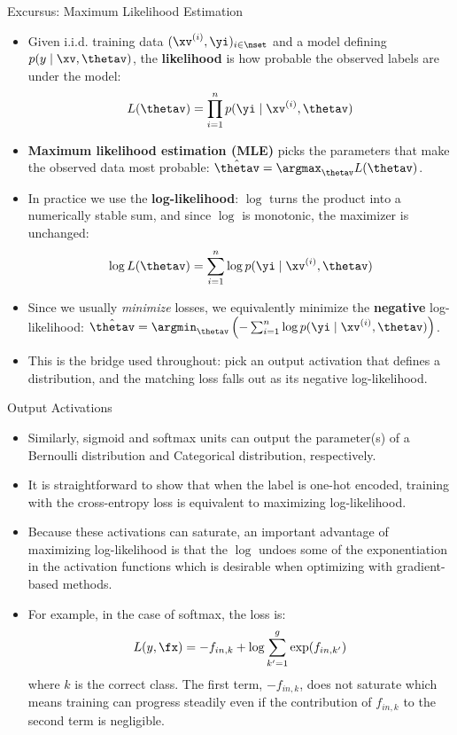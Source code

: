 \begin{vbframe}{Excursus: Maximum Likelihood Estimation}
  \begin{itemize}
    \item Given i.i.d. training data $(\xv^{(i)}, \yi)_{i \in \nset}$ and a model defining $p(y \mid \xv, \thetav)$, the \textbf{likelihood} is how probable the observed labels are under the model:
    $$L(\thetav) = \prod_{i=1}^n p(\yi \mid \xv^{(i)}, \thetav)$$
    \item \textbf{Maximum likelihood estimation (MLE)} picks the parameters that make the observed data most probable: $\hat{\thetav} = \argmax_{\thetav} L(\thetav)$.
  \end{itemize}
\framebreak

  \begin{itemize}
    \item In practice we use the \textbf{log-likelihood}: $\log$ turns the product into a numerically stable sum, and since $\log$ is monotonic, the maximizer is unchanged:
    $$\log L(\thetav) = \sum_{i=1}^n \log p(\yi \mid \xv^{(i)}, \thetav)$$
    \item Since we usually \textit{minimize} losses, we equivalently minimize the \textbf{negative} log-likelihood: $\hat{\thetav} = \argmin_{\thetav} \left(-\sum_{i=1}^n \log p(\yi \mid \xv^{(i)}, \thetav)\right)$.
    \item This is the bridge used throughout: pick an output activation that defines a distribution, and the matching loss falls out as its negative log-likelihood.
  \end{itemize}
\end{vbframe}


\begin{frame} {Output Activations}
  \small
  \begin{itemize}
    \setlength{\itemsep}{2pt}
    \item Similarly, sigmoid and softmax units can output the parameter(s) of a Bernoulli distribution and Categorical distribution, respectively.
    \item It is straightforward to show that when the label is one-hot encoded, training with the cross-entropy loss is equivalent to maximizing log-likelihood. \href{https://www.quora.com/What-are-the-differences-between-maximum-likelihood-and-cross-entropy-as-a-loss-function}{}
    \item Because these activations can saturate, an important advantage of maximizing log-likelihood is that the $\log$ undoes some of the exponentiation in the activation functions which is desirable when optimizing with gradient-based methods.
    \item For example, in the case of softmax, the loss is:
    $$ L(y, \fx) = - f_{in,k} + \log {\sum_{k'=1}^g\exp(f_{in,k'})}$$ where $k$ is the correct class. The first term, $- f_{in,k}$, does not saturate which means training can progress steadily even if the contribution of $f_{in,k}$ to the second term is negligible.
  \end{itemize}
\end{frame}

